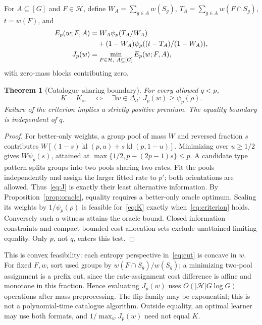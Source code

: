 \documentclass[sigconf,anonymous,review]{acmart}
\newtheorem{theorem}{Theorem}
\newcommand{\kl}{\operatorname{kl}}
\newcommand{\Kor}{K_{\mathrm{or}}}
\newcommand{\cH}{\mathcal H}
\begin{document}
For $A\subseteq[G]$ and $F\in\cH$, define
$W_A=\sum_{g\in A}w(S_g)$, $T_A=\sum_{g\in A}w(F\cap S_g)$, $t=w(F)$, and
\begin{align}
 E_p(w;F,A)&=W_A\psi_p(T_A/W_A)\notag\\
 &\quad +(1-W_A)\psi_p((t-T_A)/(1-W_A)),\label{eq:cut}\\
 J_p(w)&=\min_{F\in\cH,\ A\subseteq[G]}E_p(w;F,A),\label{eq:J}
\end{align}
with zero-mass blocks contributing zero.
\begin{theorem}[Catalogue--sharing boundary]\label{thm:main}
For every allowed $q<p$,
\begin{equation}\label{eq:criterion}
 K=\Kor\quad\Longleftrightarrow\quad
 \exists w\in\Delta_d:\ J_p(w)\ge\psi_p(\rho).
\end{equation}
Failure of the criterion implies a strictly positive premium. The equality boundary is independent of $q$.
\end{theorem}
\begin{proof}
For better-only weights, a group pool of mass $W$ and reversed fraction $s$ contributes
$W[(1-s)\kl(p,u)+s\kl(p,1-u)]$. Minimizing over $u\ge1/2$ gives $W\psi_p(s)$, attained at $\max\{1/2,p-(2p-1)s\}\le p$. A candidate type pattern splits groups into two pools sharing two rates. Fit the pools independently and assign the larger fitted rate to $p'$; both orientations are allowed. Thus~\eqref{eq:J} is exactly their least alternative information. By Proposition~\ref{prop:oracle}, equality requires a better-only oracle optimum. Scaling its weights by $1/\psi_p(\rho)$ is feasible for~\eqref{eq:K} exactly when~\eqref{eq:criterion} holds. Conversely such a witness attains the oracle bound. Closed information constraints and compact bounded-cost allocation sets exclude unattained limiting equality. Only $p$, not $q$, enters this test.
\end{proof}
This is convex feasibility: each entropy perspective in~\eqref{eq:cut} is concave in $w$. For fixed $F,w$, sort used groups by $w(F\cap S_g)/w(S_g)$; a minimizing two-pool assignment is a prefix cut, since the rate-assignment cost difference is affine and monotone in this fraction. Hence evaluating $J_p(w)$ uses $O(|\cH|G\log G)$ operations after mass preprocessing. The flip family may be exponential; this is not a polynomial-time catalogue algorithm. Outside equality, an optimal learner may use both formats, and $1/\max_wJ_p(w)$ need not equal $K$.
\end{document}
